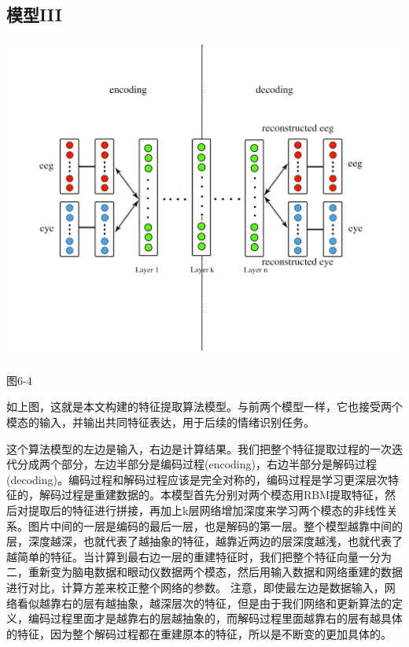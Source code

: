 	\subsection{模型III}
		\centerline{\includegraphics[width=7in]{figure/feature_learning.png}}
		\centerline{图6-4}
		
		如上图，这就是本文构建的特征提取算法模型。与前两个模型一样，它也接受两个模态的输入，并输出共同特征表达，用于后续的情绪识别任务。
		
		这个算法模型的左边是输入，右边是计算结果。我们把整个特征提取过程的一次迭代分成两个部分，左边半部分是编码过程(encoding)，右边半部分是解码过程(decoding)。编码过程和解码过程应该是完全对称的，编码过程是学习更深层次特征的，解码过程是重建数据的。本模型首先分别对两个模态用RBM提取特征，然后对提取后的特征进行拼接，再加上k层网络增加深度来学习两个模态的非线性关系。图片中间的一层是编码的最后一层，也是解码的第一层。整个模型越靠中间的层，深度越深，也就代表了越抽象的特征，越靠近两边的层深度越浅，也就代表了越简单的特征。当计算到最右边一层的重建特征时，我们把整个特征向量一分为二，重新变为脑电数据和眼动仪数据两个模态，然后用输入数据和网络重建的数据进行对比，计算方差来校正整个网络的参数。 注意，即使最左边是数据输入，网络看似越靠右的层有越抽象，越深层次的特征，但是由于我们网络和更新算法的定义，编码过程里面才是越靠右的层越抽象的，而解码过程里面越靠右的层有越具体的特征，因为整个解码过程都在重建原本的特征，所以是不断变的更加具体的。
		
